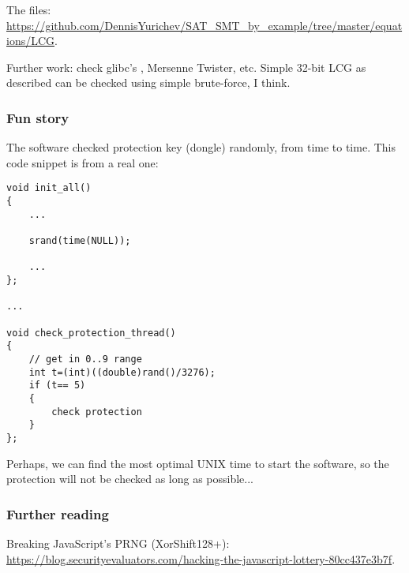 The files: \url{https://github.com/DennisYurichev/SAT_SMT_by_example/tree/master/equations/LCG}.

Further work: check glibc's , Mersenne Twister, etc. Simple 32-bit LCG as described can be checked using simple brute-force, I think.

\subsubsection{Fun story}

The software checked protection key (dongle) randomly, from time to time.
This code snippet is from a real one:

\begin{lstlisting}[style=customc]
void init_all()
{
	...

	srand(time(NULL));

	...
};

...

void check_protection_thread()
{
	// get in 0..9 range
	int t=(int)((double)rand()/3276);
	if (t== 5)
	{
		check protection
	}
};
\end{lstlisting}

Perhaps, we can find the most optimal UNIX time to start the software, so the protection will not be checked as long as possible...

\subsubsection{Further reading}

Breaking JavaScript's \ac{PRNG} (XorShift128+):
\url{https://blog.securityevaluators.com/hacking-the-javascript-lottery-80cc437e3b7f}.

